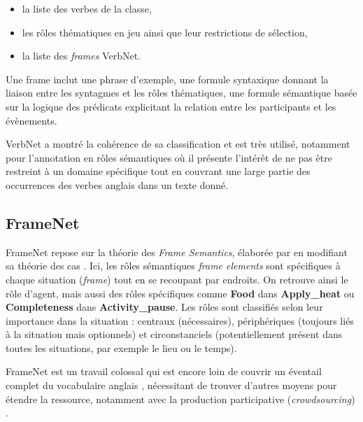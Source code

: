 \begin{itemize}
        \item la liste des verbes de la classe,
        \item les rôles thématiques en jeu ainsi que leur restrictions de sélection,
        \item la liste des \emph{frames} VerbNet.
\end{itemize}

Une frame inclut une phrase d'exemple, une formule syntaxique donnant la
liaison entre les syntagmes et les rôles thématiques, une formule sémantique
basée sur la logique des prédicats explicitant la relation entre les
participants et les évènements.



VerbNet a montré la cohérence de sa classification et est très utilisé,
notamment pour l'annotation en rôles sémantiques
\citep{swier2005exploiting,palmer2013semantic} où il présente l'intérêt de ne
pas être restreint à un domaine spécifique tout en couvrant une large partie
des occurrences des verbes anglais dans un texte donné.

\subsection{FrameNet}
\label{presentation_framenet}

FrameNet \citep{baker1998berkeley} repose sur la théorie des \textit{Frame
Semantics}, élaborée par \cite{fillmore1982frame} en modifiant sa théorie des
cas \citep{fillmore1968case}. Ici, les rôles sémantiques \textit{frame
elements} sont spécifiques à chaque situation (\textit{frame}) tout en se
recoupant par endroits. On retrouve ainsi le rôle d'agent, mais aussi des rôles
spécifiques comme \textbf{Food} dans \textbf{Apply\_heat} ou
\textbf{Completeness} dans \textbf{Activity\_pause}.  Les rôles sont classifiés
selon leur importance dans la situation : centraux (nécessaires), périphériques
(toujours liés à la situation mais optionnels) et circonstanciels
(potentiellement présent dans toutes les situations, par exemple le lieu ou le
temps).

FrameNet est un travail colossal qui est encore loin de couvrir un éventail
complet du vocabulaire anglais \citep[§5.4]{marquez2008semantic}, nécessitant
de trouver d'autres moyens pour étendre la ressource, notamment avec la
production participative (\emph{crowdsourcing})
\citep{fossati2013outsourcing,baker2014framenet}.

